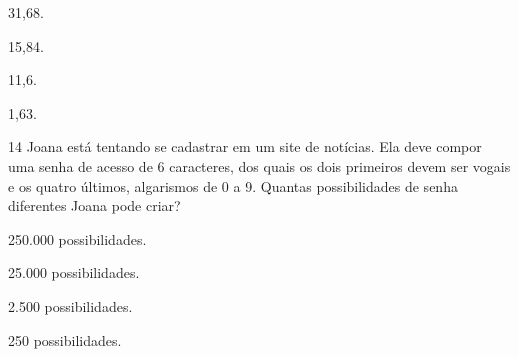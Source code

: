 \begin{escolha}
\item 31,68.
\item 15,84.
\item 11,6.
\item 1,63.
\end{escolha}










\num{14} Joana está tentando se cadastrar em um site de notícias. Ela deve
compor uma senha de acesso de 6 caracteres, dos quais os dois primeiros
devem ser vogais e os quatro últimos, algarismos de 0 a 9. Quantas
possibilidades de senha diferentes Joana pode criar?

\begin{escolha}
\item 250.000 possibilidades.
\item 25.000 possibilidades.
\item 2.500 possibilidades.
\item 250 possibilidades.
\end{escolha}



